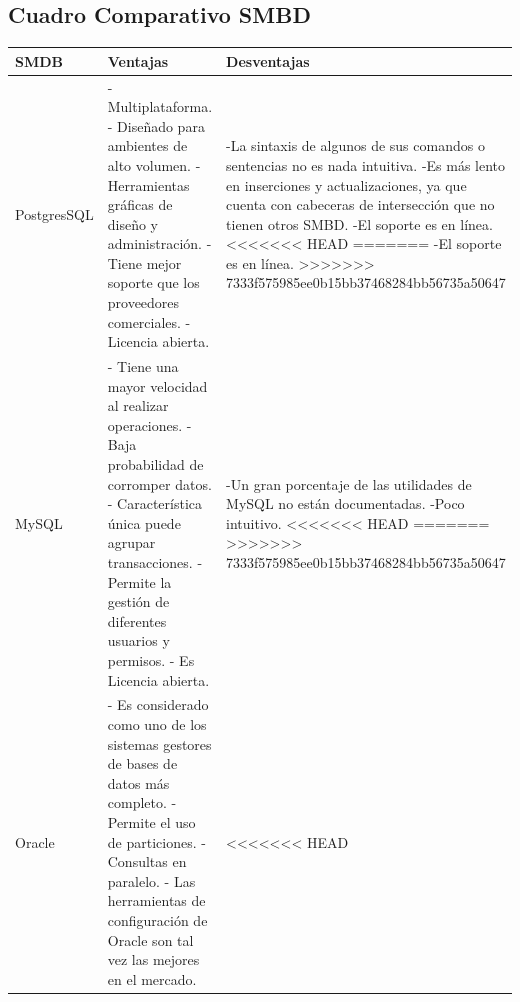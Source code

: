 \newpage
\subsection{Cuadro Comparativo SMBD}
\begin{table}[H]	
\begin{center}
\begin{tabular}{ | m{3cm} | m{4.5cm}| m{4.5cm}| } 
 \hline
 SMDB & Ventajas & Desventajas \\
 \hline
 PostgresSQL 
 &
 - Multiplataforma.
 \newline
 - Diseñado para ambientes de alto volumen.
 \newline
 - Herramientas gráficas de diseño y administración.
 \newline
 - Tiene mejor soporte que los proveedores comerciales.
 \newline
 - Licencia abierta.
 &
-La sintaxis de algunos de sus comandos o sentencias no es nada intuitiva.
\newline
-Es más lento en inserciones y actualizaciones, ya que cuenta con cabeceras de intersección que no tienen otros SMBD.
\newline
-El soporte es en línea.
<<<<<<< HEAD
=======
\newline
-El soporte es en línea.
\newline
>>>>>>> 7333f575985ee0b15bb37468284bb56735a50647
\\
  \hline
 MySQL
 &
 - Tiene una mayor velocidad al realizar operaciones.
  \newline
 - Baja probabilidad de corromper datos.
  \newline
 - Característica única puede agrupar transacciones.
  \newline
 - Permite la gestión de diferentes usuarios y permisos.
  \newline
 - Es Licencia abierta.
 &
 -Un gran porcentaje de las utilidades de MySQL no están documentadas.
 \newline
 -Poco intuitivo.
<<<<<<< HEAD
=======
 \newline
>>>>>>> 7333f575985ee0b15bb37468284bb56735a50647
 \\
 \hline
 Oracle
 &
 - Es considerado como uno de los sistemas gestores de bases de datos más completo.
  \newline
 - Permite el uso de particiones.
  \newline
 - Consultas en paralelo.
  \newline
 - Las herramientas de configuración de Oracle son tal vez las mejores en el mercado.
 &
<<<<<<< HEAD
 

\end{tabular}
\end{center}
\end{table}

